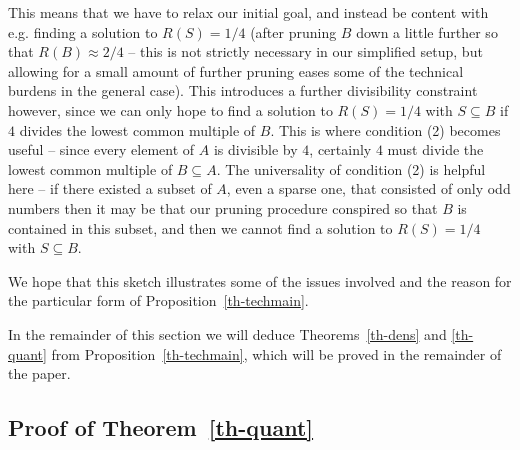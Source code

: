 \documentclass{amsart}
\begin{document}
This means that we have to relax our initial goal, and instead be content with e.g. finding a solution to $R(S)=1/4$ (after pruning $B$ down a little further so that $R(B)\approx 2/4$ -- this is not strictly necessary in our simplified setup, but allowing for a small amount of further pruning eases some of the technical burdens in the general case). This introduces a further divisibility constraint however, since we can only hope to find a solution to $R(S)=1/4$ with $S\subseteq B$ if $4$ divides the lowest common multiple of $B$. This is where condition (2) becomes useful -- since every element of $A$ is divisible by $4$, certainly $4$ must divide the lowest common multiple of $B\subseteq A$. The universality of condition (2) is helpful here -- if there existed a subset of $A$, even a sparse one, that consisted of only odd numbers then it may be that our pruning procedure conspired so that $B$ is contained in this subset, and then we cannot find a solution to $R(S)=1/4$ with $S\subseteq B$. 

We hope that this sketch illustrates some of the issues involved and the reason for the particular form of Proposition~\ref{th-techmain}. 

In the remainder of this section we will deduce Theorems~\ref{th-dens} and \ref{th-quant} from Proposition~\ref{th-techmain}, which will be proved in the remainder of the paper.

\subsection{Proof of Theorem~\ref{th-quant}}
\end{document}
